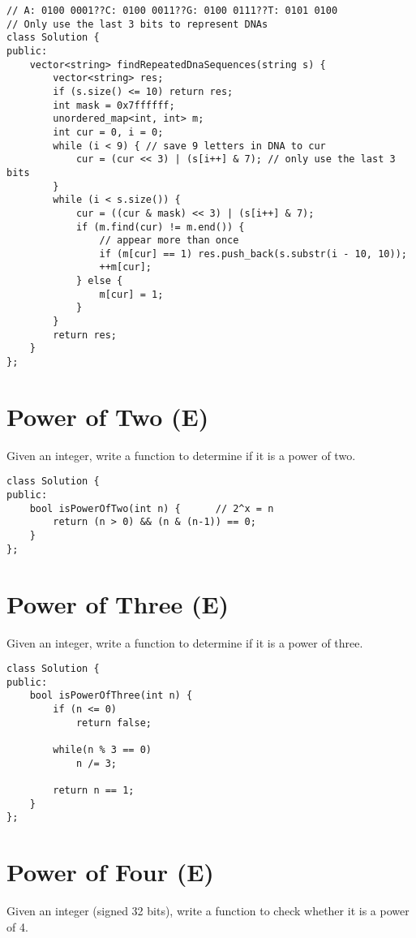 \begin{lstlisting}
// A: 0100 0001??C: 0100 0011??G: 0100 0111??T: 0101 0100
// Only use the last 3 bits to represent DNAs 
class Solution {
public:
    vector<string> findRepeatedDnaSequences(string s) {
        vector<string> res;
        if (s.size() <= 10) return res;
        int mask = 0x7ffffff;
        unordered_map<int, int> m;
        int cur = 0, i = 0;
        while (i < 9) { // save 9 letters in DNA to cur
            cur = (cur << 3) | (s[i++] & 7); // only use the last 3 bits
        }
        while (i < s.size()) {
            cur = ((cur & mask) << 3) | (s[i++] & 7);
            if (m.find(cur) != m.end()) {
                // appear more than once
                if (m[cur] == 1) res.push_back(s.substr(i - 10, 10));
                ++m[cur]; 
            } else {
                m[cur] = 1;
            }
        }
        return res;
    }
};
\end{lstlisting}


\section{Power of Two (E)}
Given an integer, write a function to determine if it is a power of two. \\
 
\begin{lstlisting}
class Solution {
public:
    bool isPowerOfTwo(int n) {      // 2^x = n
        return (n > 0) && (n & (n-1)) == 0;
    }
};
\end{lstlisting}


\section{Power of Three (E)}
Given an integer, write a function to determine if it is a power of three. \\
 
\begin{lstlisting}
class Solution {
public:
    bool isPowerOfThree(int n) {
        if (n <= 0)
            return false;
            
        while(n % 3 == 0)
            n /= 3;
            
        return n == 1;
    }
};
\end{lstlisting}


\section{Power of Four (E)}
Given an integer (signed 32 bits), write a function to check whether it is a power of 4. \\

